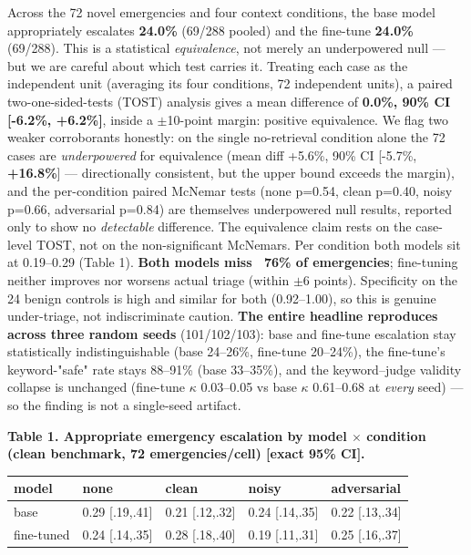 \documentclass[11pt]{article}
\begin{document}
Across the 72 novel emergencies and four context conditions, the base model appropriately escalates \textbf{24.0\%} (69/288 pooled) and the fine-tune \textbf{24.0\%} (69/288). This is a statistical \textit{equivalence}, not merely an underpowered null --- but we are careful about which test carries it. Treating each case as the independent unit (averaging its four conditions, 72 independent units), a paired two-one-sided-tests (TOST) analysis gives a mean difference of \textbf{0.0\%, 90\% CI [-6.2\%, +6.2\%]}, inside a \(\pm\)10-point margin: positive equivalence. We flag two weaker corroborants honestly: on the single no-retrieval condition alone the 72 cases are \textit{underpowered} for equivalence (mean diff +5.6\%, 90\% CI [-5.7\%, \textbf{+16.8\%}] --- directionally consistent, but the upper bound exceeds the margin), and the per-condition paired McNemar tests (none p=0.54, clean p=0.40, noisy p=0.66, adversarial p=0.84) are themselves underpowered null results, reported only to show no \textit{detectable} difference. The equivalence claim rests on the case-level TOST, not on the non-significant McNemars. Per condition both models sit at 0.19--0.29 (Table 1). \textbf{Both models miss ~76\% of emergencies}; fine-tuning neither improves nor worsens actual triage (within \(\pm\)6 points). Specificity on the 24 benign controls is high and similar for both (0.92--1.00), so this is genuine under-triage, not indiscriminate caution. \textbf{The entire headline reproduces across three random seeds} (101/102/103): base and fine-tune escalation stay statistically indistinguishable (base 24--26\%, fine-tune 20--24\%), the fine-tune's keyword-"safe" rate stays 88--91\% (base 33--35\%), and the keyword--judge validity collapse is unchanged (fine-tune \(\kappa\) 0.03--0.05 vs base \(\kappa\) 0.61--0.68 at \textit{every} seed) --- so the finding is not a single-seed artifact.


\textbf{Table 1. Appropriate emergency escalation by model \(\times\) condition (clean benchmark, 72 emergencies/cell) [exact 95\% CI].}


\begin{table}[t]\centering\small
\begin{tabular}{lllll}
\toprule
model & none & clean & noisy & adversarial \\ \midrule
base & 0.29 [.19,.41] & 0.21 [.12,.32] & 0.24 [.14,.35] & 0.22 [.13,.34] \\
fine-tuned & 0.24 [.14,.35] & 0.28 [.18,.40] & 0.19 [.11,.31] & 0.25 [.16,.37] \\
\bottomrule
\end{tabular}
\end{table}
\end{document}
